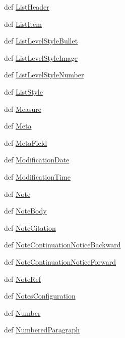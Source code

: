 \begin{DoxyCompactItemize}
def \hyperlink{namespaceodf_1_1text_afc867f5637202606e9e14c419a1506d1}{List\+Header}
\item 
def \hyperlink{namespaceodf_1_1text_a9c61277a43fb63414a62b369b5fbedf3}{List\+Item}
\item 
def \hyperlink{namespaceodf_1_1text_a57c9bc44b2609a8065f236fbd77c6e9f}{List\+Level\+Style\+Bullet}
\item 
def \hyperlink{namespaceodf_1_1text_a2db1e37c7a81e0786e1431616ea11a4f}{List\+Level\+Style\+Image}
\item 
def \hyperlink{namespaceodf_1_1text_a14aeeca62f1fdcc20d984ef9c69b0b22}{List\+Level\+Style\+Number}
\item 
def \hyperlink{namespaceodf_1_1text_a001e25096cba539946bed6b296c9199f}{List\+Style}
\item 
def \hyperlink{namespaceodf_1_1text_a424fc23edb5b366808d1a1420fa36470}{Measure}
\item 
def \hyperlink{namespaceodf_1_1text_af94eba1468427cd05e328bceec1618e4}{Meta}
\item 
def \hyperlink{namespaceodf_1_1text_aef56d0c11c1840c8ed05c079c1b28d95}{Meta\+Field}
\item 
def \hyperlink{namespaceodf_1_1text_a63b4689876e43d59b9a23e3c95782ff8}{Modification\+Date}
\item 
def \hyperlink{namespaceodf_1_1text_ad61ca495e2a4f0d8dd076560abd283e1}{Modification\+Time}
\item 
def \hyperlink{namespaceodf_1_1text_aee043b88869ba290f1a3ec47d514a954}{Note}
\item 
def \hyperlink{namespaceodf_1_1text_a3c6feb3576c9f983d23ba707d55a4916}{Note\+Body}
\item 
def \hyperlink{namespaceodf_1_1text_a5a8c97b9e0fa5d7364f80b32ea9a65ee}{Note\+Citation}
\item 
def \hyperlink{namespaceodf_1_1text_ac6efedcc39568989331cb55a9a0db99f}{Note\+Continuation\+Notice\+Backward}
\item 
def \hyperlink{namespaceodf_1_1text_a1b7015298d30a1d91007688b1d28a5d5}{Note\+Continuation\+Notice\+Forward}
\item 
def \hyperlink{namespaceodf_1_1text_ab8633c893130fb0c8491ccd45a2fd838}{Note\+Ref}
\item 
def \hyperlink{namespaceodf_1_1text_ad6d5b8f557cec789f243107cfcf96fa1}{Notes\+Configuration}
\item 
def \hyperlink{namespaceodf_1_1text_a9a821dd23a321a2694daf31951ddd434}{Number}
\item 
def \hyperlink{namespaceodf_1_1text_a14a04b61a4ca2102a6fa036cee705b22}{Numbered\+Paragraph}

\end{DoxyCompactItemize}
